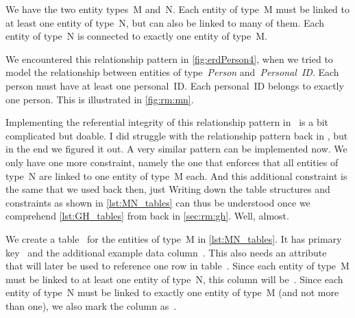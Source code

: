%
%
%
%
%
We have the two entity types~M and~N.
Each entity of type~M must be linked to at least one entity of type~N, but can also be linked to many of them.
Each entity of type~N is connected to exactly one entity of type~M.

We encountered this relationship pattern in \cref{fig:erdPerson4}, when we tried to model the relationship between entities of type~\emph{Person} and~\emph{Personal~ID}.
Each person must have at least one personal~ID.
Each personal~ID belongs to exactly one person.
This is illustrated in \cref{fig:rm:mn}.

Implementing the referential integrity of this relationship pattern in \sql\ is a bit complicated but doable.
I did struggle with the  relationship pattern back in , but in the end we figured it out.
A very similar pattern can be implemented now.
We only have one more constraint, namely the one that enforces that all entities of type~N are linked to one entity of type~M each.
And this additional constraint is the same that we used back then, just 
Writing down the table structures and constraints as shown in \cref{lst:MN_tables} can thus be understood once we comprehend \cref{lst:GH_tables} from back in \cref{sec:rm:gh}.
Well, almost.

We create a table~ for the entities of type~M in \cref{lst:MN_tables}.
It has primary key~ and the additional example data column~.
This also needs an attribute~ that will later be used to reference one row in table~.
Since each entity of type~M must be linked to at least one entity of type~N, this column will be~.
Since each entity of type~N must be linked to exactly one entity of type~M (and not more than one), we also mark the column as~.

